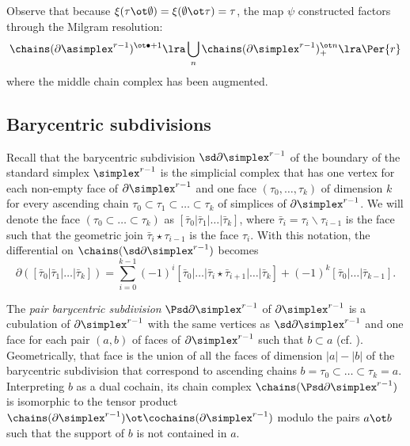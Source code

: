 
 \begin{remark}
 	Observe that because $\xi(\tau\ot \emptyset) = \xi(\emptyset\ot \tau) = \tau$, the map $\psi$ constructed factors through the Milgram resolution:
\[
\chains(\partial\asimplex^{r-1})^{\ot \bullet+1}
\lra
\bigcup_n \chains(\partial \simplex^{r-1})^{\ot n}_+
\lra
\Per{r}
\]
where the middle chain complex has been augmented.
\end{remark}



\subsection{Barycentric subdivisions}\label{s:assembly}

Recall that the barycentric subdivision $\sd \partial\simplex^{r-1}$ of the boundary of the standard simplex $\simplex^{r-1}$ is the simplicial complex that has one vertex for each non-empty face of $\partial\simplex^{r-1}$ and one face $(\tau_0,\dots,\tau_k)$ of dimension $k$ for every ascending chain $\tau_0 \subset \tau_1\subset\dots \subset \tau_k$ of simplices of $\partial \simplex^{r-1}$. We will denote the face $(\tau_0 \subset \dots \subset \tau_k)$ as $[\bar{\tau}_0|\bar{\tau}_1|\dots|\bar{\tau}_k]$, where $\bar{\tau}_i = \tau_i\smallsetminus \tau_{i-1}$ is the face such that the geometric join $\bar{\tau}_i\star \tau_{i-1}$ is the face $\tau_i$. With this notation, the differential on $\chains(\sd \partial \simplex^{r-1})$ becomes
\[
\partial([\bar{\tau}_0|\bar{\tau}_1|\dots|\bar{\tau}_k]) = \sum_{i=0}^{k-1} (-1)^i[\bar{\tau}_0|\dots|\bar{\tau}_i\star \bar{\tau}_{i+1}|\dots |\bar{\tau}_k] + (-1)^k [\bar{\tau}_0|\dots|\bar{\tau}_{k-1}].
\]

The \emph{pair barycentric subdivision} $\Psd \partial\simplex^{r-1}$ of $\partial \simplex^{r-1}$ is a cubulation of $\partial \simplex^{r-1}$ with the same vertices as $\sd \partial \simplex^{r-1}$ and one face for each pair $(a,b)$ of faces of $\partial\simplex^{r-1}$ such that $b \subset a$ (cf. \cite{Rounds2010}). Geometrically, that face is the union of all the faces of dimension $|a|-|b|$ of the barycentric subdivision that correspond to ascending chains $b = \tau_0 \subset \dots \subset \tau_k= a$. Interpreting $b$ as a dual cochain, its chain complex $\chains(\Psd \partial\simplex^{r-1})$ is isomorphic to the tensor product $\chains(\partial\simplex^{r-1}) \ot \cochains(\partial\simplex^{r-1})$ modulo the pairs $a \ot b$ such that the support of $b$ is not contained in $a$.


